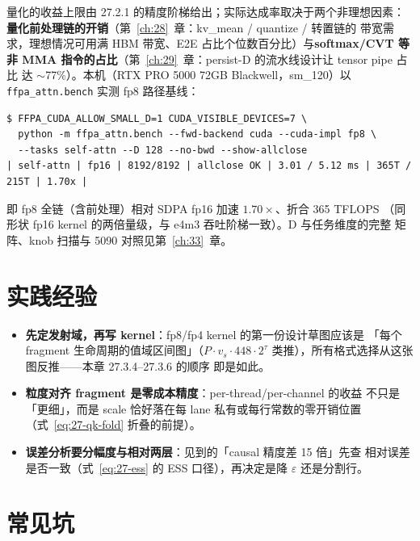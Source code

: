 量化的收益上限由 27.2.1 的精度阶梯给出；实际达成率取决于两个非理想因素：
\textbf{量化前处理链的开销}（第~\ref{ch:28}~章：kv\_mean / quantize / 转置链的
带宽需求，理想情况可用满 HBM 带宽、E2E 占比个位数百分比）与\textbf{softmax/CVT 等
非 MMA 指令的占比}（第~\ref{ch:29}~章：persist-D 的流水线设计让 tensor pipe 占比
达 $\sim$77\%）。本机（RTX PRO 5000 72GB Blackwell，sm\_120）以
\texttt{ffpa\_attn.bench} 实测 fp8 路径基线：
\begin{lstlisting}[style=console]
$ FFPA_CUDA_ALLOW_SMALL_D=1 CUDA_VISIBLE_DEVICES=7 \
  python -m ffpa_attn.bench --fwd-backend cuda --cuda-impl fp8 \
  --tasks self-attn --D 128 --no-bwd --show-allclose
| self-attn | fp16 | 8192/8192 | allclose OK | 3.01 / 5.12 ms | 365T / 215T | 1.70x |
\end{lstlisting}
即 fp8 全链（含前处理）相对 SDPA fp16 加速 $1.70\times$、折合 365 TFLOPS
（同形状 fp16 kernel 的两倍量级，与 e4m3 吞吐阶梯一致）。D 与任务维度的完整
矩阵、knob 扫描与 5090 对照见第~\ref{ch:33}~章。

\section{实践经验}

\begin{itemize}[itemsep=2pt,topsep=2pt]
  \item \textbf{先定发射域，再写 kernel}：fp8/fp4 kernel 的第一份设计草图应该是
        「每个 fragment 生命周期的值域区间图」（$P \cdot v_s \cdot 448 \cdot
        2^{\tau}$ 类推），所有格式选择从这张图反推——本章 27.3.4--27.3.6 的顺序
        即是如此。
  \item \textbf{粒度对齐 fragment 是零成本精度}：per-thread/per-channel 的收益
        不只是「更细」，而是 scale 恰好落在每 lane 私有或每行常数的零开销位置
        （式~\ref{eq:27-qk-fold} 折叠的前提）。
  \item \textbf{误差分析要分幅度与相对两层}：见到的「causal 精度差 15 倍」先查
        相对误差是否一致（式~\ref{eq:27-ess} 的 ESS 口径），再决定是降
        $\varepsilon$ 还是分割行。
\end{itemize}

\section{常见坑}

